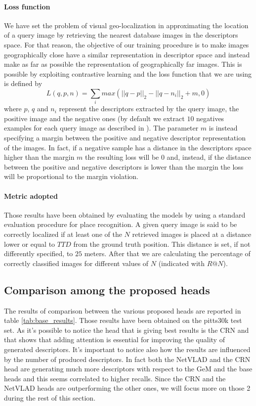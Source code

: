 \documentclass[10pt,twocolumn,letterpaper]{article}
\begin{document}
\paragraph{Loss function}
We have set the problem of visual geo-localization in approximating the location of a query image by retrieving the nearest 
database images in the descriptors space. For that reason, the objective of our training procedure is to make images geographically
close have a similar representation in descriptor space and instead make as far as possible the representation of geographically far images.
This is possible by exploiting contrastive learning and the loss function that we are using is defined by
\begin{equation}
   L(q, p, n) = \sum_i max( {|| q - p ||}_2 - {|| q - n_i||}_2 + m, 0)
\end{equation}
where $p$, $q$ and $n_i$ represent the descriptors extracted by the query image, the positive image and the negative ones (by default we extract
$10$ negatives examples for each query image as described in ).
The parameter $m$ is instead specifying a margin between the positive and negative descriptor representation of the images.
In fact, if a negative sample has a distance in the descriptors space higher than the margin $m$ the resulting loss will be $0$ and, instead,
if the distance between the positive and negative descriptors is lower than the margin the loss will be proportional to the margin violation.

\paragraph{Metric adopted}
Those results have been obtained by evaluating the models by using a standard evaluation procedure for place recognition.
A given query image is said to be correctly localized if at least one of the $N$ retrieved images is placed at a distance lower
or equal to $TTD$ from the ground truth position. This distance is set, if not differently specified, to $25$ meters. After
that we are calculating the percentage of correctly classified images for different values of $N$ (indicated with $R@N$).  

\subsection{Comparison among the proposed heads}
The results of comparison between the various proposed heads are reported in table \ref{tab:base_results}. Those results have 
been obtained on the pitts30k test set. As it's possible to notice the head that is giving best results is the CRN and that 
shows that adding attention is essential for improving the quality of generated descriptors. It's important to notice also how 
the results are influenced by the number of produced descriptors. In fact both the NetVLAD and the CRN head are generating much 
more descriptors with respect to the GeM and the base heads and this seems correlated to higher recalls. Since the CRN and the NetVLAD
heads are outperforming the other ones, we will focus more on those 2 during the rest of this section.
\end{document}
